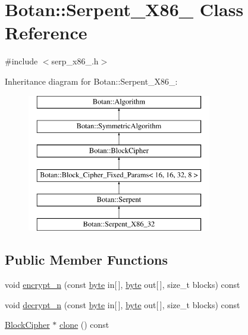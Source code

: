 \hypertarget{classBotan_1_1Serpent__X86__32}{\section{Botan\-:\-:Serpent\-\_\-\-X86\-\_ Class Reference}
\label{classBotan_1_1Serpent__X86__32}
}


{\ttfamily \#include $<$serp\-\_\-x86\-\_.\-h$>$}

Inheritance diagram for Botan\-:\-:Serpent\-\_\-\-X86\-\_\-:\begin{figure}[H]
\begin{center}
\leavevmode
\includegraphics[height=6.000000cm]{classBotan_1_1Serpent__X86__32}
\end{center}
\end{figure}
\subsection*{Public Member Functions}
\begin{DoxyCompactItemize}
\item 
void \hyperlink{classBotan_1_1Serpent__X86__32_a38cef04655217eb9024f8df040c1d232}{encrypt\-\_\-n} (const \hyperlink{namespaceBotan_a7d793989d801281df48c6b19616b8b84}{byte} in\mbox{[}$\,$\mbox{]}, \hyperlink{namespaceBotan_a7d793989d801281df48c6b19616b8b84}{byte} out\mbox{[}$\,$\mbox{]}, size\-\_\-t blocks) const 
\item 
void \hyperlink{classBotan_1_1Serpent__X86__32_aef4bc55a214e70c337730eb55c854cac}{decrypt\-\_\-n} (const \hyperlink{namespaceBotan_a7d793989d801281df48c6b19616b8b84}{byte} in\mbox{[}$\,$\mbox{]}, \hyperlink{namespaceBotan_a7d793989d801281df48c6b19616b8b84}{byte} out\mbox{[}$\,$\mbox{]}, size\-\_\-t blocks) const 
\item 
\hyperlink{classBotan_1_1BlockCipher}{Block\-Cipher} $\ast$ \hyperlink{classBotan_1_1Serpent__X86__32_aa27d5bf6b6c49ac9ae231d7795470651}{clone} () const 
\end{DoxyCompactItemize}
